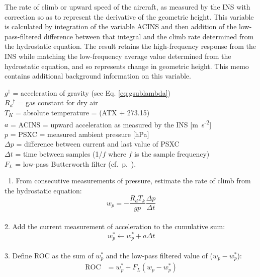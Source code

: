 \documentclass[
  english,
]{book}
\begin{document}
The rate of climb or upward speed of the aircraft, as measured by the INS with correction so as to represent the derivative of the geometric height. This variable is calculated by integration of the variable ACINS and then addition of the low-pass-filtered difference between that integral and the climb rate determined from the hydrostatic equation. The result retains the high-frequency response from the INS while matching the low-frequency average value determined from the hydrostatic equation, and so represents change in geometric height. This memo contains additional background information on this variable.

\(g^{\dagger}\) = acceleration of gravity (see Eq. \eqref{eq:gsublambda})\\
\(R_{d}{}^{\dagger}\) = gas constant for dry air\\
\(T_{K}\) = absolute temperature = (ATX + 273.15)\\
\(a\) = ACINS = upward acceleration as measured by the INS {[}m~s\textsuperscript{-2}{]}\\
\(p\) = PSXC = measured ambient pressure {[}hPa{]}\\
\(\Delta p\) = difference between current and last value of PSXC\\
\(\Delta t\) = time between samples (1/\(f\) where \(f\) is the sample
frequency)\\
\(F_{L}\) = low-pass Butterworth filter (cf.~p.~\pageref{compFilter}).

~1. From consecutive measurements of pressure, estimate the rate of climb
from the hydrostatic equation:\\
\begin{equation}
w_{p}=-\frac{R_{d}T_{k}}{gp}\frac{\Delta p}{\Delta t}
\label{eq:wphe}  
\end{equation}\\
\hspace*{0.333em}2. Add the current measurement of acceleration to the cumulative sum:
\begin{equation}
w_{p}^{*}\leftarrow w_{p}^{*}+a\Delta t
\label{eq:wpstar}
\end{equation}\\
\hspace*{0.333em}3. Define ROC as the sum of \(w_{p}^{*}\) and the low-pass filtered value
of (\(w_{p}-w_{p}^{*}\)):\\
\begin{align}
\mathrm{ROC} & =w_{p}^{*}+F_{L}(w_{p}-w_{p}^{*})
\label{eq:ROC}  
\end{align}
\end{document}
